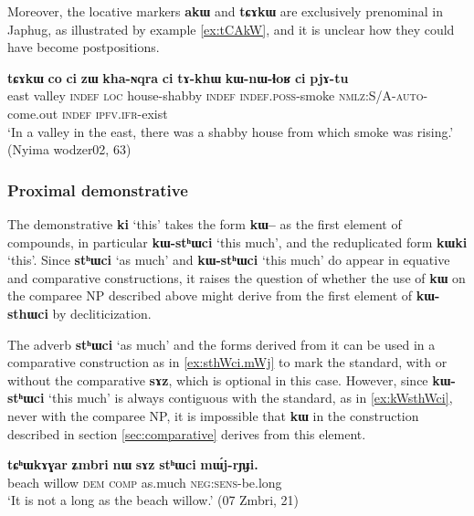 \documentclass[oldfontcommands,oneside,a4paper,11pt]{article}
\newcommand{\ipa}[1]{{\phon\textbf{#1}}}
\begin{document}
Moreover, the  locative markers \ipa{akɯ} and  \ipa{tɕɤkɯ} are exclusively prenominal in Japhug, as illustrated by example \ref{ex:tCAkW}, and it is unclear how they could have become postpositions.


\begin{exe}
\ex \label{ex:tCAkW}
\gll 
\ipa{tɕɤkɯ}  	\ipa{co}  	\ipa{ci}  	\ipa{zɯ}  	\ipa{kha-ɴqra}  	\ipa{ci}  	\ipa{tɤ-khɯ}  	\ipa{kɯ-nɯ-ɬoʁ}  	\ipa{ci}  	\ipa{pjɤ-tu}  \\
east valley \textsc{indef} \textsc{loc} house-shabby \textsc{indef} \textsc{indef.poss}-smoke \textsc{nmlz:S/A-auto}-come.out  \textsc{indef}  \textsc{ipfv.ifr}-exist \\
\glt `In a valley in the east, there was a shabby house from which smoke was rising.'  (Nyima wodzer02, 63)
\end{exe}

\subsubsection{Proximal demonstrative}
The demonstrative \ipa{ki} `this' takes the form \ipa{kɯ--} as the first element of compounds, in particular \ipa{kɯ-stʰɯci} `this much',  and the reduplicated form \ipa{kɯki} `this'.  Since \ipa{stʰɯci} `as much' and \ipa{kɯ-stʰɯci} `this much' do appear in equative and comparative constructions, it raises the question of whether the use of \ipa{kɯ} on the comparee NP described above might derive from the first element of \ipa{kɯ-sthɯci} by decliticization.

The adverb \ipa{stʰɯci} `as much' and the forms derived from it can be used in a comparative construction as in \ref{ex:sthWci.mWj} to mark the standard, with or without the comparative \ipa{sɤz}, which is optional in this case. However, since  \ipa{kɯ-stʰɯci} `this much' is always contiguous with the standard, as in \ref{ex:kWsthWci}, never with the comparee NP, it is impossible that \ipa{kɯ} in the construction described in section \ref{sec:comparative} derives from this element.
 
 
  \begin{exe}
\ex \label{ex:sthWci.mWj}
\gll 
 \ipa{tɕʰɯkɤɣar}  	\ipa{ʑmbri}  	\ipa{nɯ}  	\ipa{sɤz}  	\ipa{stʰɯci}  	\ipa{mɯ́j-rɲɟi.}  \\
beach willow \textsc{dem} \textsc{comp} as.much \textsc{neg:sens}-be.long \\
\glt `It is not a long as the beach willow.' (07 Zmbri, 21)
  \end{exe}
\end{document}
